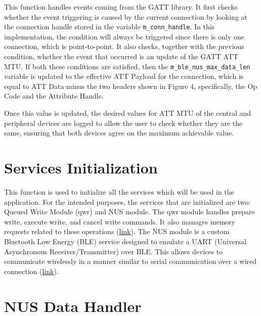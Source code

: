 \documentclass{Configuration_Files/PoliMi3i_thesis}
\begin{document}
This function handles events coming from the GATT library. It first checks whether the event triggering is caused by the current connection by looking at the connection handle stored in the variable \texttt{m\_conn\_handle}. In this implementation, the condition will always be triggered since there is only one connection, which is point-to-point. It also checks, together with the previous condition, whether the event that occurred is an update of the GATT ATT MTU. If both these conditions are satisfied, then the \texttt{m\_ble\_nus\_max\_data\_len} variable is updated to the effective ATT Payload for the connection, which is equal to ATT Data minus the two headers shown in Figure 4, specifically, the Op Code and the Attribute Handle.


Once this value is updated, the desired values for ATT MTU of the central and peripheral devices are logged to allow the user to check whether they are the same, ensuring that both devices agree on the maximum achievable value.

\section*{Services Initialization}

This function is used to initialize all the services which will be used in the application. For the intended purposes, the services that are initialized are two: Queued Write Module (qwr) and NUS module. The qwr module handles prepare write, execute write, and cancel write commands. It also manages memory requests related to these operations (\href{https://infocenter.nordicsemi.com/index.jsp?topic=%2Fcom.nordic.infocenter.sdk5.v15.0.0%2Fgroup__nrf__ble__qwr.html}{link}). The NUS module is a custom Bluetooth Low Energy (BLE) service designed to emulate a UART (Universal Asynchronous Receiver/Transmitter) over BLE. This allows devices to communicate wirelessly in a manner similar to serial communication over a wired connection (\href{https://infocenter.nordicsemi.com/index.jsp?topic=%2Fcom.nordic.infocenter.sdk5.v15.0.0%2Fgroup__ble__nus__c.html}{link}).

\section*{NUS Data Handler}
\end{document}
